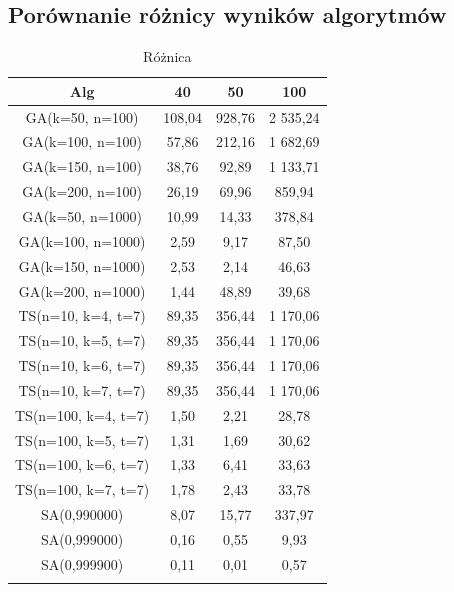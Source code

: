\documentclass[wide,a4paper,titlepage,12pt] {article}
\begin{document}
\subsection{Porównanie różnicy wyników algorytmów}
\begin{center}
    \begin{longtable}{|c|c|c|c|}
        \hline
         Alg  & 40&  50 & 100 \\ \hline
        GA(k=50, n=100)& 108,04&  928,76 & 2 535,24\\ \hline
        GA(k=100, n=100)  &  57,86 &  212,16 & 1 682,69\\ \hline
        GA(k=150, n=100)  &  38,76  & 92,89&   1 133,71\\ \hline
        GA(k=200, n=100)   & 26,19  & 69,96 &  859,94\\ \hline
        GA(k=50, n=1000)   & 10,99 &  14,33 &  378,84\\ \hline
        GA(k=100, n=1000) & 2,59  &  9,17  &  87,50\\ \hline
        GA(k=150, n=1000) &  2,53  &  2,14 &   46,63\\ \hline
        GA(k=200, n=1000)  & 1,44   & 48,89&   39,68\\ \hline
        TS(n=10, k=4, t=7) & 89,35  & 356,44 & 1 170,06\\ \hline
        TS(n=10, k=5, t=7) & 89,35  & 356,44&  1 170,06\\ \hline
        TS(n=10, k=6, t=7) & 89,35 &  356,44&  1 170,06\\ \hline
        TS(n=10, k=7, t=7) & 89,35 &  356,44 & 1 170,06\\ \hline
        TS(n=100, k=4, t=7) &1,50 &   2,21 &   28,78\\ \hline
        TS(n=100, k=5, t=7) &1,31  &  1,69 &   30,62\\ \hline
        TS(n=100, k=6, t=7)& 1,33 &  6,41  &  33,63\\ \hline
        TS(n=100, k=7, t=7) &1,78  & 2,43  &  33,78\\ \hline
        SA(0,990000)  &  8,07   & 15,77 &  337,97\\ \hline
        SA(0,999000)  &  0,16  &  0,55  &  9,93\\ \hline
        SA(0,999900)  &  0,11  &  0,01 &   0,57\\ \hline
                \caption{Różnica}
    \end{longtable}
    
\end{center}
\end{document}
